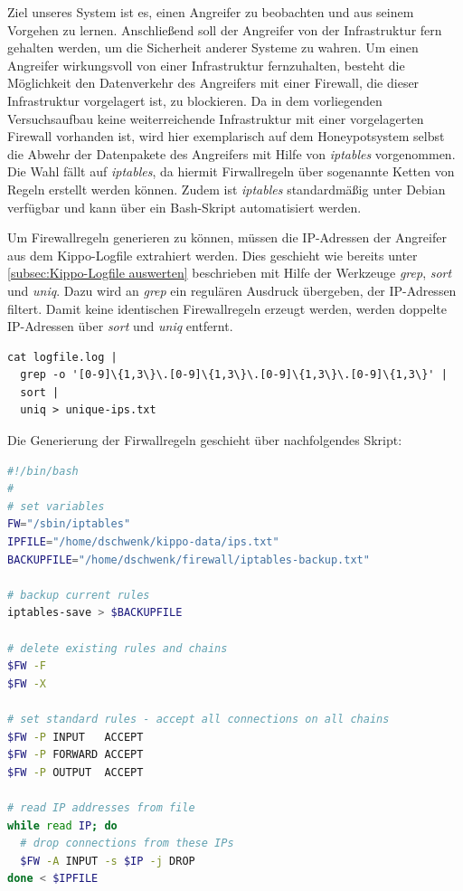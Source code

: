 Ziel unseres System ist es, einen Angreifer zu beobachten und aus seinem Vorgehen zu lernen. Anschließend soll der Angreifer von der Infrastruktur fern gehalten werden, um die Sicherheit anderer Systeme zu wahren. Um einen Angreifer wirkungsvoll von einer Infrastruktur fernzuhalten, besteht die Möglichkeit den Datenverkehr des Angreifers mit einer Firewall, die dieser Infrastruktur vorgelagert ist, zu blockieren. Da in dem vorliegenden Versuchsaufbau keine weiterreichende Infrastruktur mit einer vorgelagerten Firewall vorhanden ist, wird hier exemplarisch auf dem Honeypotsystem selbst die Abwehr der Datenpakete des Angreifers mit Hilfe von \textit{iptables} vorgenommen. Die Wahl fällt auf \textit{iptables}, da hiermit Firwallregeln über sogenannte Ketten von Regeln erstellt werden können. Zudem ist \textit{iptables} standardmäßig unter Debian verfügbar und kann über ein Bash-Skript automatisiert werden. 

Um Firewallregeln generieren zu können, müssen die IP-Adressen der Angreifer aus dem Kippo-Logfile extrahiert werden. Dies geschieht wie bereits unter \ref{subsec:Kippo-Logfile auswerten} beschrieben mit Hilfe der Werkzeuge \textit{grep}, \textit{sort} und \textit{uniq}. Dazu wird an \textit{grep} ein regulären Ausdruck übergeben, der IP-Adressen filtert. Damit keine identischen Firewallregeln erzeugt werden, werden doppelte IP-Adressen über \textit{sort} und \textit{uniq} entfernt.

\begin{lstlisting}[style=customc]
cat logfile.log | 
  grep -o '[0-9]\{1,3\}\.[0-9]\{1,3\}\.[0-9]\{1,3\}\.[0-9]\{1,3\}' |
  sort |
  uniq > unique-ips.txt
\end{lstlisting}

Die Generierung der Firwallregeln geschieht über nachfolgendes Skript:

\begin{lstlisting}[language=bash,style=customccolor]
#!/bin/bash
#
# set variables
FW="/sbin/iptables"
IPFILE="/home/dschwenk/kippo-data/ips.txt"
BACKUPFILE="/home/dschwenk/firewall/iptables-backup.txt"

# backup current rules
iptables-save > $BACKUPFILE

# delete existing rules and chains
$FW -F
$FW -X

# set standard rules - accept all connections on all chains
$FW -P INPUT   ACCEPT
$FW -P FORWARD ACCEPT
$FW -P OUTPUT  ACCEPT

# read IP addresses from file
while read IP; do
  # drop connections from these IPs
  $FW -A INPUT -s $IP -j DROP 
done < $IPFILE


\end{lstlisting}

